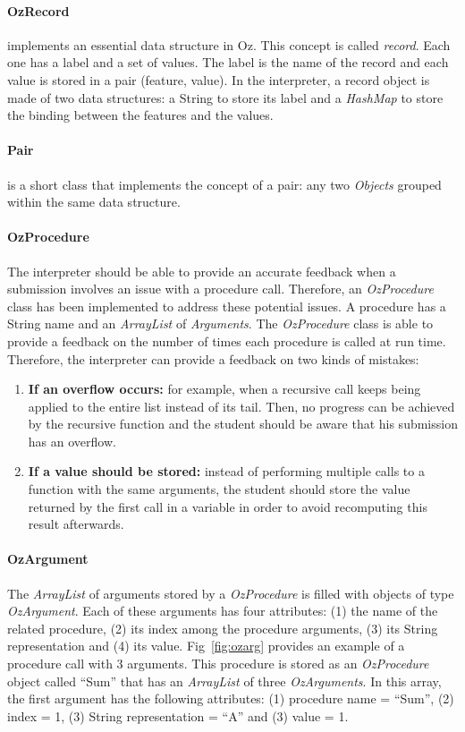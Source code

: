 \documentclass[11pt,a4paper,twoside,openright]{report}
\begin{document}
\paragraph{OzRecord}
implements an essential data structure in Oz. This concept is called 
\textit{record}. Each one has a label and a set of values. The label is the 
name of the record and each value is stored in a pair (feature, value). In the 
interpreter, a record object is made of two data structures: a String to store 
its label and a \textit{HashMap} to store the binding between the features and 
the values.

\paragraph{Pair}
is a short class that implements the concept of a pair: any two 
\textit{Objects} grouped within the same data structure.

\paragraph{OzProcedure}
The interpreter should be able to provide an accurate feedback when a
submission involves an issue with a procedure call. Therefore, an 
\textit{OzProcedure} class has been implemented to address these potential 
issues. A procedure has a String name and an \textit{ArrayList} of 
\textit{Arguments}. The \textit{OzProcedure} class is able to provide a 
feedback on the number of times each procedure is called at run time. Therefore, 
the interpreter can provide a feedback on two kinds of mistakes:

\begin{enumerate}
\item \textbf{If an overflow occurs:} for example, when a recursive call 
keeps being applied to the entire list instead of its tail. Then, no progress 
can be achieved by the recursive function and the student should be aware that 
his submission has an overflow.
\item \textbf{If a value should be stored:} instead of performing 
multiple calls to a function with the same arguments, the student should store 
the value returned by the first call in a variable in order to avoid 
recomputing this result afterwards.
\end{enumerate}


\paragraph{OzArgument}
The \textit{ArrayList} of arguments stored by a \textit{OzProcedure} is filled 
with objects of type \textit{OzArgument}. Each of these arguments
has four attributes: (1) the name of the related procedure, (2) its index among 
the procedure arguments, (3) its String representation and (4) its value. 
Fig~\ref{fig:ozarg} provides an example of a procedure call with 3 arguments. 
This procedure is stored as an \textit{OzProcedure} object called
\enquote{Sum} that has an \textit{ArrayList} of three \textit{OzArguments}. In 
this array, the first argument has the following attributes: (1) procedure name 
= \enquote{Sum}, (2) index = 1, (3) String representation = \enquote{A} and (3) 
value = 1.
\end{document}
